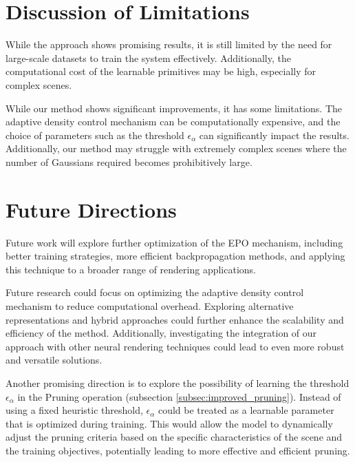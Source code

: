 \documentclass[11pt]{report}
\begin{document}
\section{Discussion of Limitations}

While the approach shows promising results, it is still limited by the need for large-scale datasets to train the system effectively. Additionally, the computational cost of the learnable primitives may be high, especially for complex scenes.

While our method shows significant improvements, it has some limitations. The adaptive density control mechanism can be computationally expensive, and the choice of parameters such as the threshold $\epsilon_\alpha$ can significantly impact the results. Additionally, our method may struggle with extremely complex scenes where the number of Gaussians required becomes prohibitively large.

\section{Future Directions}

Future work will explore further optimization of the EPO mechanism, including better training strategies, more efficient backpropagation methods, and applying this technique to a broader range of rendering applications.

Future research could focus on optimizing the adaptive density control mechanism to reduce computational overhead. Exploring alternative representations and hybrid approaches could further enhance the scalability and efficiency of the method. Additionally, investigating the integration of our approach with other neural rendering techniques could lead to even more robust and versatile solutions.

Another promising direction is to explore the possibility of learning the threshold $\epsilon_\alpha$ in the Pruning operation (subsection \ref{subsec:improved_pruning}). Instead of using a fixed heuristic threshold, $\epsilon_\alpha$ could be treated as a learnable parameter that is optimized during training. This would allow the model to dynamically adjust the pruning criteria based on the specific characteristics of the scene and the training objectives, potentially leading to more effective and efficient pruning.
\end{document}
